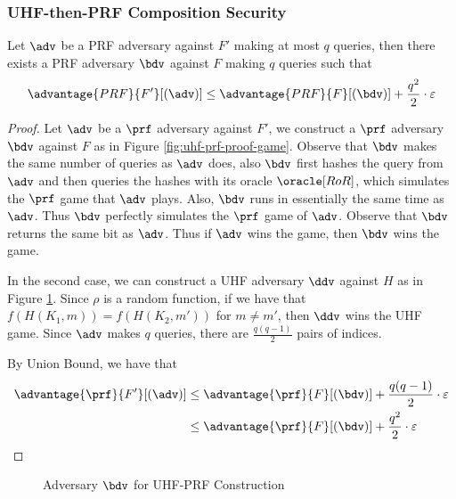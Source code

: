 \documentclass[11pt,a4paper]{article}
\begin{document}
\subsubsection{UHF-then-PRF Composition Security}
Let $\adv$ be a PRF adversary against $F'$ making at most $q$ queries, then there exists a PRF adversary $\bdv$ against $F$ making $q$ queries such that 
$$
\advantage{PRF}{F'}[(\adv)] \leq \advantage{PRF}{F}[(\bdv)] + \frac{q^2}{2} \cdot \varepsilon
$$

\begin{proof} 
Let $\adv$ be a $\prf$ adversary against $F'$, we construct a $\prf$ adversary $\bdv$ against $F$ as in Figure \ref{fig:uhf-prf-proof-game}. 
Observe that $\bdv$ makes the same number of queries as $\adv$ does, also $\bdv$ first hashes the query from $\adv$ and then queries the hashes with its oracle $\oracle[RoR]$, which simulates the $\prf$ game that $\adv$ plays. Also, $\bdv$ runs in essentially the same time as $\adv$. Thus $\bdv$ perfectly simulates the $\prf$ game of $\adv$. Observe that $\bdv$ returns the same bit as $\adv$. Thus if $\adv$ wins the game, then $\bdv$ wins the game. 

In the second case, we can construct a UHF adversary $\ddv$ against $H$ as in Figure \ref{fig:uhf-prf-proof-adv-b}. Since $\rho$ is a random function, if we have that $f(H(K_1, m)) = f(H(K_2, m'))$ for $m \neq m'$, then $\ddv$ wins the UHF game. Since $\adv$ makes $q$ queries, there are $\frac{q(q-1)}{2}$ pairs of indices. 

By Union Bound, we have that
$$
\begin{aligned}
\advantage{\prf}{F'}[(\adv)] &\leq \advantage{\prf}{F}[(\bdv)] + \frac{q(q-1)}{2} \cdot \varepsilon \\
&\leq  \advantage{\prf}{F}[(\bdv)] + \frac{q^2}{2} \cdot \varepsilon
\end{aligned}
$$
\end{proof}


\begin{figure}[H]
\begin{pchstack}[center, boxed, space=0.5cm]

\end{pchstack}
\caption{Adversary $\bdv$ for UHF-PRF Construction}
\label{fig:uhf-prf-proof-adv-b}
\end{figure}
\end{document}
